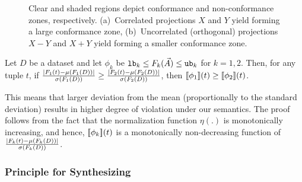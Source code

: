 \begin{figure}
{\begin{subfigure}{.18\textwidth}
	  \vspace{-6mm}
	  \caption{}
	  \label{subfig:views3}
	\end{subfigure}
	}
	\vspace{-4mm}
        \caption{\small
		Clear and shaded regions depict conformance and non-conformance zones, respectively.
		(a)~Correlated projections $X$ and $Y$ yield \dis forming a large conformance zone, %
		(b)~Uncorrelated (orthogonal) projections $X-Y$ and $X+Y$ yield \dis forming a smaller conformance zone.%
		}
	\label{fig:views}
	\vspace{-3mm}
\end{figure}

\begin{lemma}\label{lemma:helper}
    Let $D$ be a dataset and let 
    $\phi_k$ be ${\mathtt{lb}}_k \leq F_k(\vec{A})\leq {\mathtt{ub}}_k$ for $k=1,2$.
    Then, for any tuple $t$, if 
    $\frac{|F_1(t) - {\mathtt{\mu}}(F_1(D))|}{{\mathtt{\sigma}}(F_1(D))} \geq \frac{|F_2(t) - {\mathtt{\mu}}(F_2(D))|}{{\mathtt{\sigma}}(F_2(D))}$,
    then ${[\![{\phi_1}]\!]}(t) \geq {[\![{\phi_2}]\!]}(t)$.
\end{lemma}
%
This means that larger deviation from the mean (proportionally to
the standard deviation) results in higher degree of violation under our
semantics. The proof follows from the fact that the normalization function
$\eta(.)$ is monotonically increasing, and hence, ${[\![{\phi_k}]\!]}(t)$ is a
monotonically non-decreasing function of $\frac{|F_k(t) -
{\mathtt{\mu}}(F_k(D))|}{{\mathtt{\sigma}}(F_k(D))}$.


\subsubsection{Principle for Synthesizing \Views}\label{view-synthesis}
%

